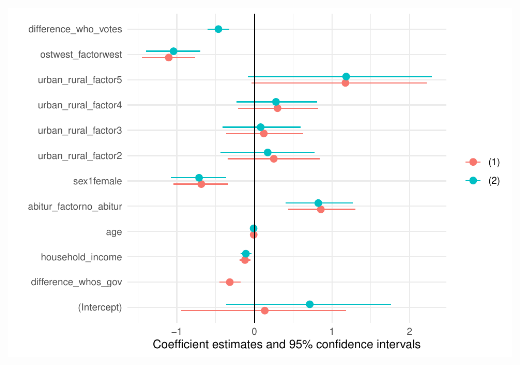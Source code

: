 \documentclass[
]{article}
\begin{document}
\includegraphics{AVCD_Final_Assignment-Edenhofer_latest_files/figure-latex/simple-models-lack-rep-1.pdf}
\end{document}
